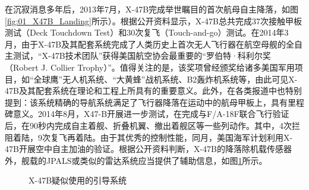 在沉寂消息多年后，2013年7月，X-47B完成举世瞩目的首次航母自主降落，如图\ref{fig:01_X47B_Landing}所示）。根据公开资料显示\cite{X_47B}，X-47B总共完成37次接触甲板测试（Deck Touchdown Test）和30次复飞（Touch-and-go）测试。在2014年3月，由于X-47B及其配套系统完成了人类历史上首次无人飞行器在航空母舰的全自主测试，“X-47B技术团队”获得美国航空协会最重要的“罗伯特·科利尔奖（Robert J. Collier Trophy）”\cite{X_47B_Award}。值得关注的是，该奖项曾经颁奖给诸多美国军用项目，如“全球鹰”无人机系统、“大黄蜂”战机系统、B2轰炸机系统等，由此可见X-47B及其配套系统在理论和工程上所具有的重要意义。此外，在各类报道中也特别提到：该系统精确的导航系统满足了飞行器降落在运动中的航母甲板上，具有里程碑意义\cite{X_47B_Report}。2014年8月，X47-B开展进一步测试，在完成与F/A-18F联合飞行验证后，在90秒内完成自主着舰、折叠机翼、撤出着舰区等一些列动作。其中，4次拦阻着陆，9次复飞再着陆。由于其优秀的控制性能，同月，美国海军计划利用X-47B开展空中自主加油的验证。根据公开资料判断，X-47B的降落除机载传感器外，舰载的JPALS或类似的雷达系统应当提供了辅助信息，如图\ref{fig:X47B_LandingOptical}所示。

\begin{figure}[htb]
	\centering%
	\hspace{1em}%
	\caption{X-47B疑似使用的引导系统}
	\label{fig:X47B_LandingOptical}
\end{figure}



